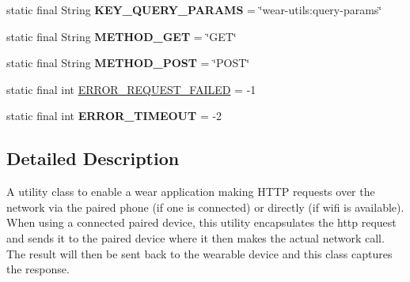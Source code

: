 \begin{DoxyCompactItemize}
\item 
static final String {\bfseries K\+E\+Y\+\_\+\+Q\+U\+E\+R\+Y\+\_\+\+P\+A\+R\+A\+MS} = \char`\"{}wear-\/utils\+:query-\/params\char`\"{}\hypertarget{classcom_1_1google_1_1devrel_1_1wcl_1_1connectivity_1_1WearHttpHelper_a4e2532050781a424933e03edb2349edf}{}\label{classcom_1_1google_1_1devrel_1_1wcl_1_1connectivity_1_1WearHttpHelper_a4e2532050781a424933e03edb2349edf}

\item 
static final String {\bfseries M\+E\+T\+H\+O\+D\+\_\+\+G\+ET} = \char`\"{}G\+ET\char`\"{}\hypertarget{classcom_1_1google_1_1devrel_1_1wcl_1_1connectivity_1_1WearHttpHelper_a45ed272f412add4ef609cdeb538a400e}{}\label{classcom_1_1google_1_1devrel_1_1wcl_1_1connectivity_1_1WearHttpHelper_a45ed272f412add4ef609cdeb538a400e}

\item 
static final String {\bfseries M\+E\+T\+H\+O\+D\+\_\+\+P\+O\+ST} = \char`\"{}P\+O\+ST\char`\"{}\hypertarget{classcom_1_1google_1_1devrel_1_1wcl_1_1connectivity_1_1WearHttpHelper_a400867ab16437912f98cf06ccc5f3110}{}\label{classcom_1_1google_1_1devrel_1_1wcl_1_1connectivity_1_1WearHttpHelper_a400867ab16437912f98cf06ccc5f3110}

\item 
static final int \hyperlink{classcom_1_1google_1_1devrel_1_1wcl_1_1connectivity_1_1WearHttpHelper_a2197635e920afce19b37161a7657fcbc}{E\+R\+R\+O\+R\+\_\+\+R\+E\+Q\+U\+E\+S\+T\+\_\+\+F\+A\+I\+L\+ED} = -\/1
\item 
static final int {\bfseries E\+R\+R\+O\+R\+\_\+\+T\+I\+M\+E\+O\+UT} = -\/2\hypertarget{classcom_1_1google_1_1devrel_1_1wcl_1_1connectivity_1_1WearHttpHelper_ad47fb6c355ffa8af59cc6172e6742762}{}\label{classcom_1_1google_1_1devrel_1_1wcl_1_1connectivity_1_1WearHttpHelper_ad47fb6c355ffa8af59cc6172e6742762}

\end{DoxyCompactItemize}


\subsection{Detailed Description}
A utility class to enable a wear application making H\+T\+TP requests over the network via the paired phone (if one is connected) or directly (if wifi is available). When using a connected paired device, this utility encapsulates the http request and sends it to the paired device where it then makes the actual network call. The result will then be sent back to the wearable device and this class captures the response. 

